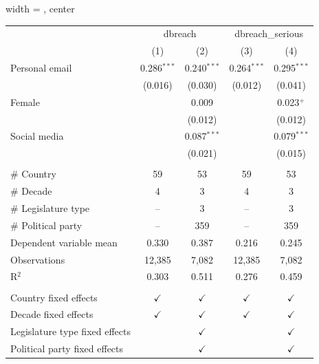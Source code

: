 
\begingroup
\centering
\begin{adjustbox}{width = \textwidth, center}
   \begin{tabular}{lcccc}
      \toprule
       & \multicolumn{2}{c}{dbreach} & \multicolumn{2}{c}{dbreach\_serious}\\
                                     & (1)           & (2)           & (3)           & (4)\\  
      \midrule 
      Personal email                 & 0.286$^{***}$ & 0.240$^{***}$ & 0.264$^{***}$ & 0.295$^{***}$\\   
                                     & (0.016)       & (0.030)       & (0.012)       & (0.041)\\   
      Female                         &               & 0.009         &               & 0.023$^{+}$\\   
                                     &               & (0.012)       &               & (0.012)\\   
      Social media                   &               & 0.087$^{***}$ &               & 0.079$^{***}$\\   
                                     &               & (0.021)       &               & (0.015)\\   
       \\
      \# Country                     & 59            & 53            & 59            & 53\\  
      \# Decade                      & 4             & 3             & 4             & 3\\  
      \# Legislature type            & --            & 3             & --            & 3\\  
      \# Political party             & --            & 359           & --            & 359\\  
      Dependent variable mean        & 0.330         & 0.387         & 0.216         & 0.245\\  
      Observations                   & 12,385        & 7,082         & 12,385        & 7,082\\  
      R$^2$                          & 0.303         & 0.511         & 0.276         & 0.459\\  
       \\
      Country fixed effects          & $\checkmark$  & $\checkmark$  & $\checkmark$  & $\checkmark$\\   
      Decade fixed effects           & $\checkmark$  & $\checkmark$  & $\checkmark$  & $\checkmark$\\   
      Legislature type fixed effects &               & $\checkmark$  &               & $\checkmark$\\   
      Political party fixed effects  &               & $\checkmark$  &               & $\checkmark$\\   
      \bottomrule
   \end{tabular}
\end{adjustbox}
\par\endgroup


